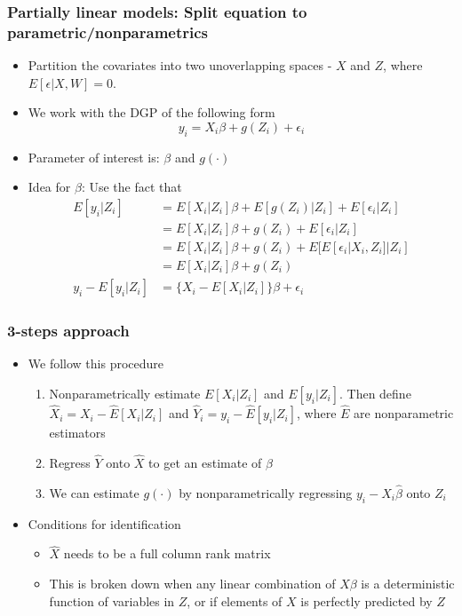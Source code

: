 \documentclass[aspectratio=169]{beamer}
\begin{document}
\begin{frame}
\frametitle{Partially linear models: Split equation to parametric/nonparametrics}
\begin{itemize}
\item Partition the covariates into two unoverlapping spaces - $X$ and $Z$, where $E[\epsilon|X,W]=0$. 
\item We work with the DGP of the following form
\[
y_i = X_i\beta + g(Z_i)+\epsilon_i 
\]
\item Parameter of interest is: $\beta$ and $g(\cdot)$
\item Idea for $\beta$: Use the fact that
\begin{align*}
E[y_i|Z_i]&=E[X_i|Z_i]\beta + E[g(Z_i)|Z_i]+E[\epsilon_i|Z_i]\\
&=E[X_i|Z_i]\beta + g(Z_i)+E[\epsilon_i|Z_i]\\
&=E[X_i|Z_i]\beta + g(Z_i)+E[E[\epsilon_i|X_i,Z_i]|Z_i] \\
&= E[X_i|Z_i]\beta +g(Z_i)\\
y_i-E[y_i|Z_i]&= \{X_i-E[X_i|Z_i]\}\beta +\epsilon_i
\end{align*}\par
\end{itemize}
\end{frame}

\begin{frame}
\frametitle{3-steps approach}
\begin{itemize}
\item We follow this procedure
\begin{enumerate}
\item Nonparametrically estimate $E[X_i|Z_i]$ and $E[y_i|Z_i]$. Then define $\widehat{X}_i=X_i-\widehat{E}[X_i|Z_i]$ and $\widehat{Y}_i = y_i-\widehat{E}[y_i|Z_i]$, where $\widehat{E}$ are nonparametric estimators
\item Regress $\widehat{Y}$ onto $\widehat{X}$ to get an estimate of $\beta$
\item We can estimate $g(\cdot)$ by nonparametrically regressing $y_i-X_i\hat{\beta}$ onto $Z_i$
\end{enumerate}
\item Conditions for identification
\begin{itemize}
\item $\widehat{X}$ needs to be a full column rank matrix
\item This is broken down when any linear combination of $X\beta$ is a deterministic function of variables in $Z$, or if elements of $X$ is perfectly predicted by $Z$
\end{itemize}
\end{itemize}
\end{frame}
\end{document}
